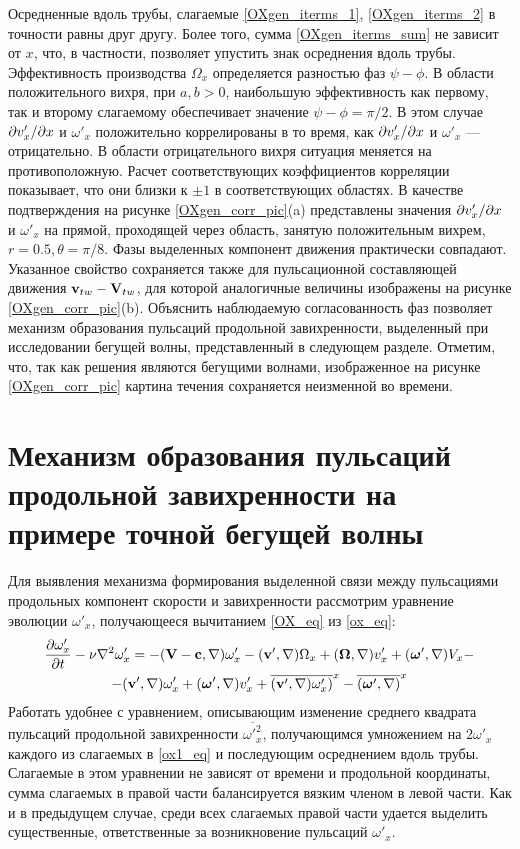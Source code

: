 Осредненные вдоль трубы, слагаемые \eqref{OXgen_iterms_1}, \eqref{OXgen_iterms_2} в точности равны друг другу. Более того, сумма \eqref{OXgen_iterms_sum} не зависит от $x$, что, в частности, позволяет упустить знак осреднения вдоль трубы. Эффективность производства  $\Omega_x$ определяется разностью фаз $\psi - \phi$. В области положительного вихря, при $a,b > 0$, наибольшую эффективность как первому, так и второму слагаемому обеспечивает значение $\psi - \phi = \pi/2$. В этом случае $\partial v'_x/\partial x$ и $\omega'_x$ положительно коррелированы в то время, как $\partial v'_x/\partial x$ и $\omega'_x$ --- отрицательно. В области отрицательного вихря ситуация меняется на противоположную. Расчет соответствующих коэффициентов корреляции показывает, что они близки к $\pm1$ в соответствующих областях. В качестве подтверждения на рисунке \ref{OXgen_corr_pic}(a) представлены значения $\partial v'_x/\partial x$ и $\omega'_x$ на прямой, проходящей через область, занятую положительным вихрем, $r = 0.5, \theta = \pi/8$. Фазы выделенных компонент движения практически совпадают. Указанное свойство сохраняется также для пульсационной составляющей движения $\mathbf{v}_{tw} - \mathbf{V}_{tw}$, для которой аналогичные величины изображены на рисунке \ref{OXgen_corr_pic}(b). Объяснить наблюдаемую согласованность фаз позволяет механизм образования пульсаций продольной завихренности, выделенный при исследовании бегущей волны, представленный в следующем разделе. Отметим, что, так как решения являются бегущими волнами, изображенное на рисунке \ref{OXgen_corr_pic} картина течения сохраняется неизменной во времени. 


\section{Механизм образования пульсаций продольной завихренности на примере точной бегущей волны}

Для выявления механизма формирования выделенной связи между пульсациями продольных компонент скорости и завихренности рассмотрим уравнение эволюции $\omega'_x$, получающееся вычитанием \eqref{OX_eq} из \eqref{ox_eq}:
\begin{multline}\label{ox1_eq}
\frac{\partial \omega'_x}{\partial t} - \nu \nabla^2 \omega'_x = - (\mathbf{V} - \mathbf{c}, \nabla) \omega'_x - (\mathbf{v}', \nabla) \Omega_x
+(\mbox{\boldmath$\Omega$}, \nabla) v'_x + (\mbox{\boldmath$\omega$}', \nabla) V_x -\\- (\mathbf{v}', \nabla) \omega'_x  + (\mbox{\boldmath$\omega$}', \nabla) v'_x  + \overline{(\mathbf{v}', \nabla) \omega'_x)}^x  - \overline{(\mbox{\boldmath$\omega$}', \nabla)}^x
\end{multline}
Работать удобнее с уравнением, описывающим изменение среднего квадрата пульсаций продольной завихренности $\overline{\omega'^2_x}$, получающимся умножением на $2\omega'_x$ каждого из слагаемых в \eqref{ox1_eq} и последующим осреднением вдоль трубы. Слагаемые в этом уравнении не зависят от времени и продольной координаты, сумма слагаемых в правой части балансируется вязким членом в левой части. Как и в предыдущем случае, среди всех слагаемых правой части удается выделить существенные, ответственные за возникновение пульсаций $\omega'_x$.


